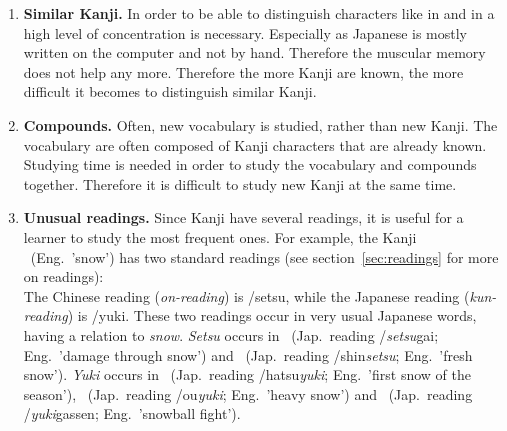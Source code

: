 \begin{enumerate}
  \item \textbf{Similar Kanji.} In order to be able to distinguish characters 
        like  in  and  in  a high level of
        concentration is necessary. Especially as Japanese is mostly written
        on the computer and not by hand. Therefore the muscular memory 
        does not help any more. Therefore the more Kanji are known, the more 
        difficult it becomes to distinguish similar Kanji.

  \item \textbf{Compounds.} Often, new vocabulary is studied, rather than new 
        Kanji. The vocabulary are often composed of Kanji characters that are 
        already known. Studying time is needed in order to study the vocabulary 
        and compounds together. Therefore it is difficult to study new Kanji 
        at the same time.

  \item \textbf{Unusual readings.} Since Kanji have several readings, 
        it is useful for a learner to study the most frequent ones.
        For example, the Kanji ~(Eng.\ 'snow') has two 
        standard readings (see section~\ref{sec:readings} for more on 
        readings):\\
        The Chinese reading (\emph{on-reading}) is /setsu, 
        while the Japanese reading (\emph{kun-reading}) is /yuki.
        These two readings occur in very usual Japanese words, having a 
        relation to \emph{snow}. \emph{Setsu} occurs in
        ~(Jap.\ reading /\emph{setsu}gai; 
        Eng.\ 'damage through snow') and
        ~(Jap.\ reading /shin\emph{setsu}; 
        Eng.\ 'fresh snow').
        \emph{Yuki} occurs in
        ~(Jap.\ reading /hatsu\emph{yuki}; 
        Eng.\ 'first snow of the season'),
        ~(Jap.\ reading /ou\emph{yuki}; 
        Eng.\ 'heavy snow') and
        ~(Jap.\ reading /\emph{yuki}gassen; 
        Eng.\ 'snowball fight'). 


\end{enumerate}
